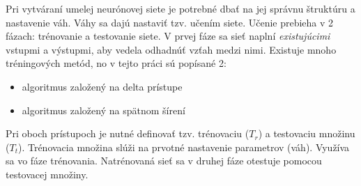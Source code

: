 Pri vytváraní umelej neurónovej siete je potrebné dbať na jej správnu štruktúru a nastavenie váh.
Váhy sa dajú nastaviť tzv. učením siete.
Učenie prebieha v 2 fázach: trénovanie a testovanie siete.
V prvej fáze sa sieť naplní \emph{existujúcimi} vstupmi a výstupmi, aby vedela odhadnúť vzťah medzi nimi.
Existuje mnoho tréningových metód, no v tejto práci sú popísané 2:
\begin{itemize}
    \item algoritmus založený na delta prístupe
    \item algoritmus založený na spätnom šírení
\end{itemize}
Pri oboch prístupoch je nutné definovať tzv. trénovaciu ($T_r$) a testovaciu množinu ($T_t$).
Trénovacia množina slúži na prvotné nastavenie parametrov (váh).
Využíva sa vo fáze trénovania.
Natrénovaná sieť sa v druhej fáze otestuje pomocou testovacej množiny.

